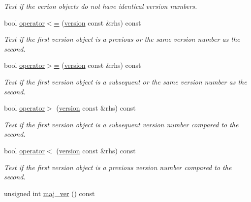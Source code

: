 \begin{DoxyCompactItemize}
\begin{DoxyCompactList}\small\item\em Test if the verion objects do not have identical version numbers. \end{DoxyCompactList}\item 
\hypertarget{classgfx_1_1version_a5b38b5e2deb34a7943f3a37d4cad57eb}{bool \hyperlink{classgfx_1_1version_a5b38b5e2deb34a7943f3a37d4cad57eb}{operator$<$=} (\hyperlink{classgfx_1_1version}{version} const \&rhs) const }\label{classgfx_1_1version_a5b38b5e2deb34a7943f3a37d4cad57eb}

\begin{DoxyCompactList}\small\item\em Test if the first version object is a previous or the same version number as the second. \end{DoxyCompactList}\item 
\hypertarget{classgfx_1_1version_ac2329e3b392a45a5cf86249a02b83842}{bool \hyperlink{classgfx_1_1version_ac2329e3b392a45a5cf86249a02b83842}{operator$>$=} (\hyperlink{classgfx_1_1version}{version} const \&rhs) const }\label{classgfx_1_1version_ac2329e3b392a45a5cf86249a02b83842}

\begin{DoxyCompactList}\small\item\em Test if the first version object is a subsequent or the same version number as the second. \end{DoxyCompactList}\item 
\hypertarget{classgfx_1_1version_a0bb23c10d0b81ba3788c80ab81c2471e}{bool \hyperlink{classgfx_1_1version_a0bb23c10d0b81ba3788c80ab81c2471e}{operator$>$} (\hyperlink{classgfx_1_1version}{version} const \&rhs) const }\label{classgfx_1_1version_a0bb23c10d0b81ba3788c80ab81c2471e}

\begin{DoxyCompactList}\small\item\em Test if the first version object is a subsequent version number compared to the second. \end{DoxyCompactList}\item 
\hypertarget{classgfx_1_1version_a5b20ffc688dbb8717f653f1926d65eda}{bool \hyperlink{classgfx_1_1version_a5b20ffc688dbb8717f653f1926d65eda}{operator$<$} (\hyperlink{classgfx_1_1version}{version} const \&rhs) const }\label{classgfx_1_1version_a5b20ffc688dbb8717f653f1926d65eda}

\begin{DoxyCompactList}\small\item\em Test if the first version object is a previous version number compared to the second. \end{DoxyCompactList}\item 
\hypertarget{classgfx_1_1version_a90b65c4eb3cd1307e8ec829e689ca1ce}{unsigned int \hyperlink{classgfx_1_1version_a90b65c4eb3cd1307e8ec829e689ca1ce}{maj\-\_\-ver} () const }\label{classgfx_1_1version_a90b65c4eb3cd1307e8ec829e689ca1ce}


\end{DoxyCompactItemize}
